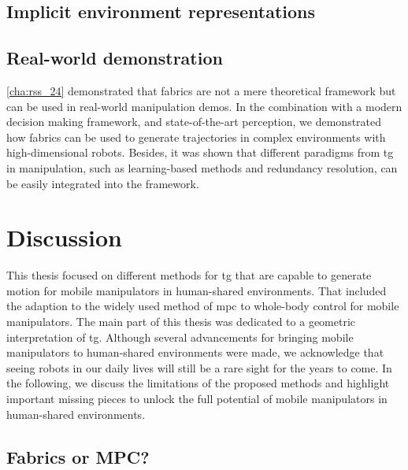 \subsection{Implicit environment representations}
\label{sec:conclusion_implicit}


\subsection{Real-world demonstration}
\label{sec:conclusion_real_world}

\cref{cha:rss_24} demonstrated that \ac{fabrics} are not a mere theoretical
framework but can be used in real-world manipulation demos. In the combination
with a modern decision making framework, and state-of-the-art perception, 
we demonstrated how \ac{fabrics} can be used to generate trajectories in complex
environments with high-dimensional robots. Besides, it was shown that different
paradigms from \ac{tg} in manipulation, such as learning-based methods and
redundancy resolution, can be easily integrated into the framework.

\section{Discussion}
\label{sec:discussion}

This thesis focused on different methods for \ac{tg} that are capable to
generate motion for mobile manipulators in human-shared environments. That
included the adaption to the widely used method of \ac{mpc}
to whole-body control for mobile
manipulators. The main part of this thesis was dedicated to a geometric
interpretation of \ac{tg}. Although several advancements for bringing mobile
manipulators to human-shared environments were made, we acknowledge
that seeing robots in our daily lives will still be a rare sight for the years
to come. In the following, we discuss the limitations of the proposed methods
and highlight important missing pieces to unlock the full potential of mobile
manipulators in human-shared environments.

\subsection{Fabrics or MPC?}
\label{sec:discussion_fabrics_or_mpc}

